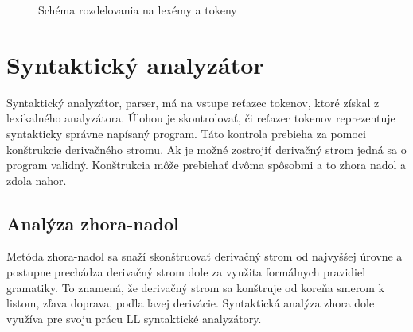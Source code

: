 \begin{center}
\begin{figure}
\caption{Schéma rozdelovania na lexémy a tokeny}
\label{fig:lex}

\end{figure}
\end{center}


\section{Syntaktický analyzátor}
Syntaktický analyzátor, parser, má na vstupe reťazec tokenov, ktoré získal
z lexikalného analyzátora. Úlohou je skontrolovať, či
reťazec tokenov reprezentuje syntakticky správne napísaný program. Táto kontrola
prebieha za pomoci konštrukcie derivačného stromu. Ak je možné zostrojiť derivačný strom
jedná sa o program validný. Konštrukcia môže prebiehať dvôma spôsobmi a to zhora
nadol a zdola nahor. \cite{meduna} 

\subsection{Analýza zhora-nadol}
Metóda zhora-nadol sa snaží skonštruovať derivačný strom od najvyššej úrovne a postupne prechádza derivačný strom dole za využita formálnych pravidiel gramatiky. To znamená, že derivačný strom sa konštruje od koreňa smerom k listom, zľava doprava, poďla ľavej derivácie. Syntaktická analýza zhora dole využíva pre svoju prácu LL syntaktické analyzátory. \cite{aho}


